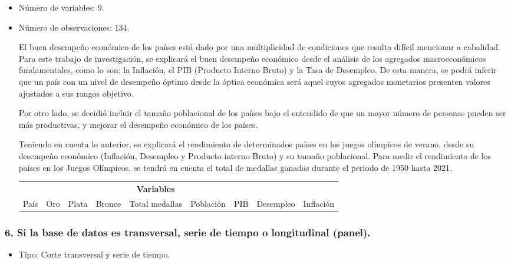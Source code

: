 \documentclass[
]{article}
\providecommand{\tightlist}{%
  \setlength{\itemsep}{0pt}\setlength{\parskip}{0pt}}
\begin{document}
\begin{itemize}
\item
  Número de variables: 9.
\item
  Número de observaciones: 134.

  El buen desempeño económico de los países está dado por una
  multiplicidad de condiciones que resulta difícil mencionar a
  cabalidad. Para este trabajo de investigación, se explicará el buen
  desempeño económico desde el análisis de los agregados macroeconómicos
  fundamentales, como lo son: la Inflación, el PIB (Producto Interno
  Bruto) y la Tasa de Desempleo. De esta manera, se podrá inferir que un
  país con un nivel de desempeño óptimo desde la óptica económica será
  aquel cuyos agregados monetarios presenten valores ajustados a sus
  rangos objetivo.

  Por otro lado, se decidió incluir el tamaño poblacional de los países
  bajo el entendido de que un mayor número de personas pueden ser más
  productivas, y mejorar el desempeño económico de los países.

  Teniendo en cuenta lo anterior, se explicará el rendimiento de
  determinados países en los juegos olímpicos de verano, desde su
  desempeño económico (Inflación, Desempleo y Producto interno Bruto) y
  su tamaño poblacional. Para medir el rendimiento de los países en los
  Juegos Olímpicos, se tendrá en cuenta el total de medallas ganadas
  durante el periodo de 1950 hasta 2021.

  \begin{longtable}[]{@{}ccccccccc@{}}
  \toprule
  \endhead
  & & & & \textbf{Variables} & & & &\tabularnewline
  País & Oro & Plata & Bronce & Total medallas & Población & PIB &
  Desempleo & Inflación\tabularnewline
  \bottomrule
  \end{longtable}
\end{itemize}

\hypertarget{si-la-base-de-datos-es-transversal-serie-de-tiempo-o-longitudinal-panel.}{%
\subsubsection{\texorpdfstring{\textbf{6.} Si la base de datos es
transversal, serie de tiempo o longitudinal
(panel).}{6. Si la base de datos es transversal, serie de tiempo o longitudinal (panel).}}\label{si-la-base-de-datos-es-transversal-serie-de-tiempo-o-longitudinal-panel.}}

\begin{itemize}
\tightlist
\item
  Tipo: Corte transversal y serie de tiempo.
\end{itemize}
\end{document}
